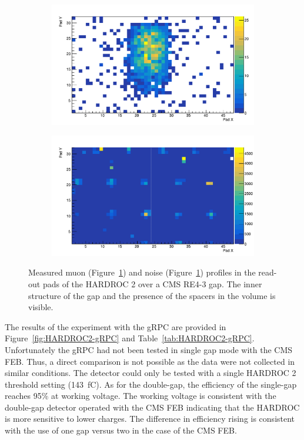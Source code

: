 	\begin{figure}[H]
		\begin{subfigure}{.5\linewidth}
		    \centering
			\includegraphics[width = \linewidth]{fig/chapt6/Muon-Profile-RE4-HARDROC.pdf}
			\caption{\label{fig:HARDROC2-profiles:A}}
		\end{subfigure}
		\begin{subfigure}{.5\linewidth}
		    \centering
			\includegraphics[width = \linewidth]{fig/chapt6/Noise-Profile-RE4-HARDROC.pdf}
			\caption{\label{fig:HARDROC2-profiles:B}}
		\end{subfigure}
		\caption{\label{fig:HARDROC2-profiles} Measured muon (Figure~\ref{fig:HARDROC2-profiles:A}) and noise (Figure~\ref{fig:HARDROC2-profiles:A}) profiles in the read-out pads of the HARDROC 2 over a CMS RE4-3 gap. The inner structure of the gap and the presence of the spacers in the volume is visible.}
    \end{figure}
	
	The results of the experiment with the gRPC are provided in Figure~\ref{fig:HARDROC2-gRPC} and Table~\ref{tab:HARDROC2-gRPC}. Unfortunately the gRPC had not been tested in single gap mode with the CMS FEB. Thus, a direct comparison is not possible as the data were not collected in similar conditions. The detector could only be tested with a single HARDROC 2 threshold setting (\SI{143}{fC}). As for the double-gap, the efficiency of the single-gap reaches 95\% at working voltage. The working voltage is consistent with the double-gap detector operated with the CMS FEB indicating that the HARDROC is more sensitive to lower charges. The difference in efficiency rising is consistent with the use of one gap versus two in the case of the CMS FEB.
	
